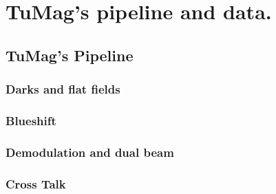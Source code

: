 \chapter{\label{CH:Pipeline}TuMag's pipeline and data.}

\section{TuMag's Pipeline}

\subsection{Darks and flat fields}
\subsection{Blueshift}
\subsection{Demodulation and dual beam}
\subsection{Cross Talk}

